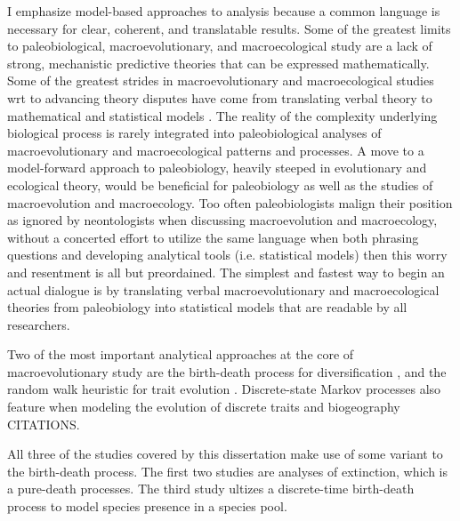 I emphasize model-based approaches to analysis because a common language is necessary for clear, coherent, and translatable results. Some of the greatest limits to paleobiological, macroevolutionary, and macroecological study are a lack of strong, mechanistic predictive theories that can be expressed mathematically. Some of the greatest strides in macroevolutionary and macroecological studies wrt to advancing theory disputes have come from translating verbal theory to mathematical and statistical models \citep{Hunt2006a,Hunt2007,Shipley2006}. The reality of the complexity underlying biological process is rarely integrated into paleobiological analyses of macroevolutionary and macroecological patterns and processes. A move to a model-forward approach to paleobiology, heavily steeped in evolutionary and ecological theory, would be beneficial for paleobiology as well as the studies of macroevolution and macroecology. Too often paleobiologists malign their position as ignored by neontologists when discussing macroevolution and macroecology, without a concerted effort to utilize the same language when both phrasing questions and developing analytical tools (i.e. statistical models) then this worry and resentment is all but preordained. The simplest and fastest way to begin an actual dialogue is by translating verbal macroevolutionary and macroecological theories from paleobiology into statistical models that are readable by all researchers.

Two of the most important analytical approaches at the core of macroevolutionary study are the birth-death process for diversification \citep{Raup1973,Raup1985,Nee1992,Nee1994a,Nee2001,Nee2006b,Stadler2013b}, and the random walk heuristic for trait evolution \citep{Raup1974a,Felsenstein1985b,Bookstein1987b,Gingerich1993,Roopnarine2001a,Roopnarine2003b,Roopnarine1999,Sheets2001,Hunt2006a,Hunt2007a}. Discrete-state Markov processes also feature when modeling the evolution of discrete traits and biogeography CITATIONS.

All three of the studies covered by this dissertation make use of some variant to the birth-death process. The first two studies are analyses of extinction, which is a pure-death processes. The third study ultizes a discrete-time birth-death process to model species presence in a species pool.

